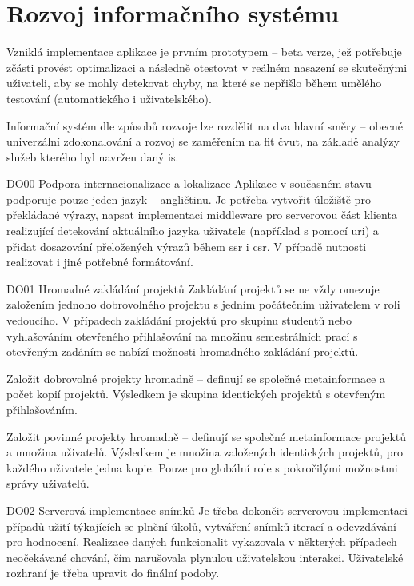 \chapter{Rozvoj informačního systému}

Vzniklá implementace aplikace je prvním prototypem -- beta verze, jež potřebuje zčásti provést optimalizaci a následně otestovat v reálném nasazení se skutečnými uživateli, aby se mohly detekovat chyby, na které se nepřišlo během umělého testování (automatického i uživatelského). 

Informační systém dle způsobů rozvoje lze rozdělit na dva hlavní směry -- obecné univerzální zdokonalování a rozvoj se zaměřením na \gls{fit} \gls{čvut}, na základě analýzy služeb kterého byl navržen daný \gls{is}. 

\begin{dl}   

   \item[DO00 Podpora internacionalizace a lokalizace]
   Aplikace v současném stavu podporuje pouze jeden jazyk -- angličtinu. Je potřeba vytvořit úložiště pro překládané výrazy, napsat implementaci middleware pro serverovou část klienta realizující detekování aktuálního jazyka uživatele (například s pomocí \gls{uri}) a přidat dosazování přeložených výrazů během \gls{ssr} i \gls{csr}. V případě nutnosti realizovat i jiné potřebné formátování.
    
   \item[DO01 Hromadné zakládání projektů] 
   Zakládání projektů se ne vždy omezuje založením jednoho dobrovolného projektu s jedním počátečním uživatelem v roli vedoucího. V případech zakládání projektů pro skupinu studentů nebo vyhlašováním otevřeného přihlašování na množinu semestrálních prací s otevřeným zadáním se nabízí možnosti hromadného zakládání projektů.

   Založit dobrovolné projekty hromadně -- definují se společné metainformace a počet kopií projektů. Výsledkem je skupina identických projektů s otevřeným přihlašováním.

   Založit povinné projekty hromadně -- definují se společné metainformace projektů a množina uživatelů. Výsledkem je množina založených identických projektů, pro každého uživatele jedna kopie. Pouze pro globální role s pokročilými možnostmi správy uživatelů.

   \item[DO02 Serverová implementace snímků] 
   Je třeba dokončit serverovou implementaci případů užití týkajících se plnění úkolů, vytváření snímků iterací a odevzdávání pro hodnocení. Realizace daných funkcionalit vykazovala v některých případech neočekávané chování, čím narušovala plynulou uživatelskou interakci. Uživatelské rozhraní je třeba upravit do finální podoby.


\end{dl}
